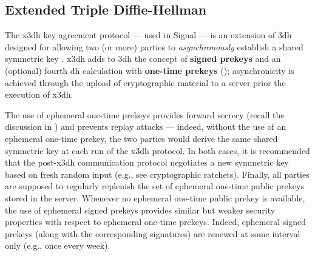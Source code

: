 

\subsection{Extended Triple Diffie-Hellman}\label{sec:diffie_hellman:x3dh}

The \gls{x3dh} key agreement protocol --- used in Signal
--- is an extension of \gls{3dh} designed for allowing two (or more) parties to \textit{asynchronously} establish a shared symmetric key \cite{marlinspike_x3dh_2016}. \gls{x3dh} adds to \gls{3dh} the concept of \textbf{signed prekeys} and an (optional) fourth \gls{dh} calculation with \textbf{one-time prekeys} (); asynchronicity is achieved through the upload of cryptographic material to a server prior the execution of \gls{x3dh}.


The use of ephemeral one-time prekeys provides forward secrecy (recall the discussion in ) and prevents replay attacks --- indeed, without the use of an ephemeral one-time prekey, the two parties would derive the same shared symmetric key at each run of the \gls{x3dh} protocol. In both cases, it is recommended that the post-\gls{x3dh} communication protocol negotiates a new symmetric key based on fresh random input (e.g., see cryptographic ratchets).
Finally, all parties are supposed to regularly replenish the set of ephemeral one-time public prekeys stored in the server. Whenever no ephemeral one-time public prekey is available, the use of ephemeral signed prekeys provides similar but weaker security properties with respect to ephemeral one-time prekeys. Indeed, ephemeral signed prekeys (along with the corresponding signatures) are renewed at some interval only (e.g., once every week).


